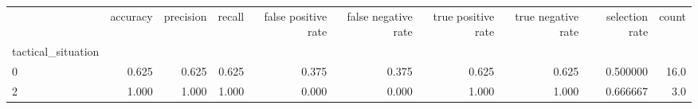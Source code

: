 \begin{tabular}{lrrrrrrrrr}
\toprule
{} &  accuracy &  precision &  recall &  false positive rate &  false negative rate &  true positive rate &  true negative rate &  selection rate &  count \\
tactical\_situation &           &            &         &                      &                      &                     &                     &                 &        \\
\midrule
0                  &     0.625 &      0.625 &   0.625 &                0.375 &                0.375 &               0.625 &               0.625 &        0.500000 &   16.0 \\
2                  &     1.000 &      1.000 &   1.000 &                0.000 &                0.000 &               1.000 &               1.000 &        0.666667 &    3.0 \\
\bottomrule
\end{tabular}
